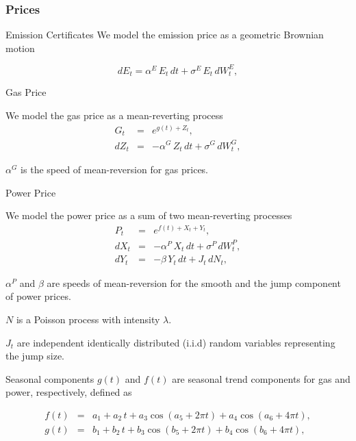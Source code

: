 \subsubsection{Prices}

{ Emission Certificates}
We model the emission price as a geometric Brownian motion

\begin{equation}
d{E}_t = \alpha^E\,E_t\,d{t} + \sigma^E\,E_t\,d{W}^E_t,
\label{co2}
\end{equation}

{Gas Price}
\item We model the gas price as a mean-reverting process
\begin{eqnarray}
G_t & = & e^{g(t) + Z_t},  \nonumber \\
d{Z}_t & = & -\alpha^G\,Z_t\,d{t} + \sigma^G\,d{W}^G_t,
\label{gas}
\end{eqnarray}
\item $\alpha^G$ is the speed of mean-reversion for gas prices.

{Power Price}
\item We model the power price as a sum of two mean-reverting processes
\begin{eqnarray}
P_t & = & e^{f(t) + X_t + Y_t},  \nonumber \\
d{X}_t & = & -\alpha^P\,X_t\,d{t} + \sigma^P\,d{W}^P_t, \nonumber \\
d{Y}_t & = & -\beta\,Y_t\,d{t} + J_t\,d{N}_t,
\label{power}
\end{eqnarray}
\item $\alpha^P$ and $\beta$ are speeds of mean-reversion for the smooth and the jump component of power prices.
\item $N$ is a Poisson process with intensity $\lambda$.
\item $J_t$ are independent identically distributed (i.i.d) random variables representing the jump size.

{Seasonal components}
$g(t)$ and $f(t)$ are seasonal trend components for gas and power, respectively, defined as

\begin{eqnarray}
f(t) &=& a_1 + a_2\,t + a_3\cos(a_5 + 2\pi t) + a_4\cos(a_6 + 4\pi t), \nonumber \\
g(t) &=& b_1 + b_2\,t + b_3\cos(b_5 + 2\pi t) + b_4\cos(b_6 + 4\pi t), \nonumber \\
\label{grseasonality}
\end{eqnarray}


